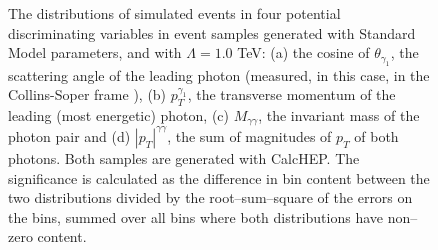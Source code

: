 \begin{figure}[htp]
\begin{minipage}[b]{.499\textwidth}
\begin{infilsf}\tiny
\hspace{-.9em}\makebox[.96\textwidth]{}
\end{infilsf}
\vspace{-1em}
\end{minipage}
\hfill
\begin{minipage}[b]{.499\textwidth}
\begin{infilsf} \tiny
\makebox[.96\textwidth]{}
\end{infilsf}
\vspace{-1em}
\end{minipage}

\vspace{1em}

\noindent
\begin{minipage}[b]{.499\textwidth}
\begin{infilsf} \tiny
\hspace{-.2em}\makebox[.96\textwidth]{ }
\end{infilsf}
\vspace{-1em}
\end{minipage}\hfill
\begin{minipage}[b]{.499\textwidth}
\begin{infilsf} \tiny
\makebox[.96\textwidth]{}
\end{infilsf}
\vspace{-1em}
\end{minipage}
\begin{minipage}[t]{\textwidth}
\caption{The distributions of simulated events in four potential discriminating variables in event samples generated with Standard Model parameters, and with $\Lambda = 1.0$ TeV: (a) the cosine of $\theta_{\gamma_1}$, the scattering angle of the leading photon (measured, in this case, in the Collins-Soper frame \cite{collinssoper}), (b) $p_T^{\gamma_1}$, the transverse momentum of the leading (most energetic) photon, (c) $M_{\gamma\gamma}$, the invariant mass of the photon pair and (d) $|p_T|^{\gamma\gamma}$, the sum of magnitudes of $p_T$ of both photons. Both samples are generated with CalcHEP. The significance is calculated as the difference in bin content between the two distributions divided by the root--sum--square of the errors on the bins, summed over all bins where both distributions have non--zero content.
\label{discr}}
\end{minipage}
\end{figure}


